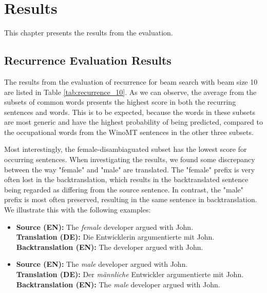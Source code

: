 \chapter{Results}
\label{ch:Results}







This chapter presents the results from the evaluation. 

\section{Recurrence Evaluation Results}
\label{ch:Results:Recurrence}

The results from the evaluation of recurrence for beam search with beam size 10 are listed in Table \ref{tab:recurrence_10}.
As we can observe, the average from the subsets of common words presents the highest score in both the recurring sentences and words. This is to be expected, because the words in these subsets are most generic and have the highest probability of being predicted, compared to the occupational words from the WinoMT sentences in the other three subsets. 

Most interestingly, the female-disambiaguated subset has the lowest score for occurring sentences. When investigating the results, we found some discrepancy between the way "female" and "male" are translated. The "female" prefix is very often lost in the backtranslation, which results in the backtranslated sentence being regarded as differing from the source sentence. In contrast, the "male" prefix is most often preserved, resulting in the same sentence in backtranslation. We illustrate this with the following examples:

\begin{itemize}
    \item \textbf{Source (EN):} The \textit{female} developer argued with John. \\
    \textbf{Translation (DE):} Die Entwicklerin argumentierte mit John. \\
    \textbf{Backtranslation (EN):} The developer argued with John.
    
    \item \textbf{Source (EN):} The \textit{male} developer argued with John. \\
    \textbf{Translation (DE):} Der \textit{männliche} Entwickler argumentierte mit John. \\
    \textbf{Backtranslation (EN):} The \textit{male} developer argued with John.
\end{itemize}

